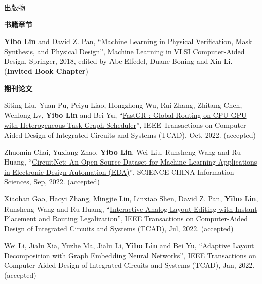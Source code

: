 \begin{rSection}{出版物}



\textbf{书籍章节}
        

\begin{description}[font=\normalfont, rightmargin=2em]
    

\item[{[B1]}]{
        \textbf{Yibo Lin} and David Z. Pan, 
    ``\href{http://dx.doi.org/10.1007/978-3-030-04666-8_4}{Machine Learning in Physical Verification, Mask Synthesis, and Physical Design}'', 
    Machine Learning in VLSI Computer-Aided Design, Springer, 2018, edited by Abe Elfedel, Duane Boning and Xin Li.
    (\textbf{Invited Book Chapter})
}
            

\end{description}
    

\textbf{期刊论文}
        

\begin{description}[font=\normalfont, rightmargin=2em]
    

\item[{[J35]}]{
        Siting Liu, Yuan Pu, Peiyu Liao, Hongzhong Wu, Rui Zhang, Zhitang Chen, Wenlong Lv, \textbf{Yibo Lin} and Bei Yu, 
    ``\href{https://doi.org/10.1109/TCAD.2022.3217668}{FastGR : Global Routing on CPU-GPU with Heterogeneous Task Graph Scheduler}'', 
    IEEE Transactions on Computer-Aided Design of Integrated Circuits and Systems (TCAD), Oct, 2022.
    (accepted)
}
            

\item[{[J34]}]{
        Zhuomin Chai, Yuxiang Zhao, \textbf{Yibo Lin}, Wei Liu, Runsheng Wang and Ru Huang, 
    ``\href{https://www.sciengine.com/SCIS/doi/10.1007/s11432-022-3571-8}{CircuitNet: An Open-Source Dataset for Machine Learning Applications in Electronic Design Automation (EDA)}'', 
    SCIENCE CHINA Information Sciences, Sep, 2022.
    (accepted)
}
            

\item[{[J33]}]{
        Xiaohan Gao, Haoyi Zhang, Mingjie Liu, Linxiao Shen, David Z. Pan, \textbf{Yibo Lin}, Runsheng Wang and Ru Huang, 
    ``\href{https://doi.org/10.1109/TCAD.2022.3190234}{Interactive Analog Layout Editing with Instant Placement and Routing Legalization}'', 
    IEEE Transactions on Computer-Aided Design of Integrated Circuits and Systems (TCAD), Jul, 2022.
    (accepted)
}
            

\item[{[J32]}]{
        Wei Li, Jialu Xia, Yuzhe Ma, Jialu Li, \textbf{Yibo Lin} and Bei Yu, 
    ``\href{https://doi.org/10.1109/TCAD.2022.3140729}{Adaptive Layout Decomposition with Graph Embedding Neural Networks}'', 
    IEEE Transactions on Computer-Aided Design of Integrated Circuits and Systems (TCAD), Jan, 2022.
    (accepted)
}
            


\end{description}
\end{rSection}
